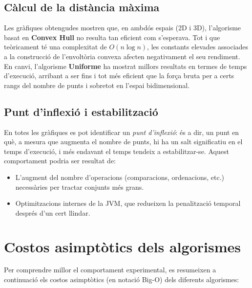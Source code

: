 \documentclass{ieeetj}
\begin{document}
\subsection*{Càlcul de la distància màxima}


Les gràfiques obtengudes mostren que, en ambdós espais (2D i 3D), l'algorisme basat en \textbf{Convex Hull} no resulta tan eficient com s'esperava. Tot i que teòricament té una complexitat de \(O(n\log n)\), les constants elevades associades a la construcció de l'envoltòria convexa afecten negativament el seu rendiment. En canvi, l'algorisme \textbf{Uniforme} ha mostrat millors resultats en termes de temps d'execució, arribant a ser fins i tot més eficient que la força bruta per a certs rangs del nombre de punts i sobretot en l'espai bidimensional.

\subsection*{Punt d'inflexió i estabilització}

En totes les gràfiques es pot identificar un \emph{punt d'inflexió}: és a dir, un punt en què, a mesura que augmenta el nombre de punts, hi ha un salt significatiu en el temps d'execució, i més endavant el temps tendeix a estabilitzar-se. Aquest comportament podria ser resultat de:
\begin{itemize}
    \item L'augment del nombre d'operacions (comparacions, ordenacions, etc.) necessàries per tractar conjunts més grans.
    \item Optimitzacions internes de la JVM, que redueixen la penalització temporal després d'un cert llindar.
\end{itemize}

\section*{Costos asimptòtics dels algorismes}

Per comprendre millor el comportament experimental, es resumeixen a continuació els costos asimptòtics (en notació Big-O) dels diferents algorismes:
\end{document}
